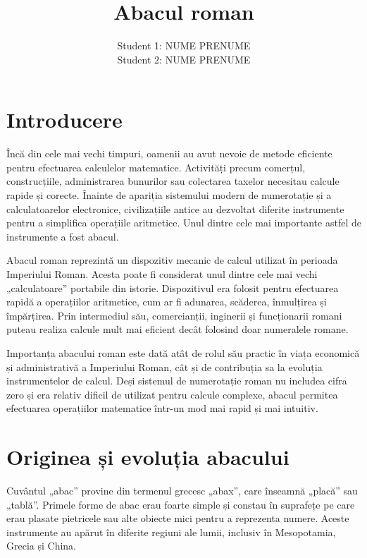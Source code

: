 \documentclass[12pt,a4paper]{article}
\title{\textbf{Abacul roman}}
\author{
Student 1: NUME PRENUME \\
Student 2: NUME PRENUME
}
\date{}
\begin{document}
\maketitle
\thispagestyle{empty}

\newpage

\section*{Introducere}

Încă din cele mai vechi timpuri, oamenii au avut nevoie de metode eficiente pentru efectuarea calculelor matematice. Activități precum comerțul, construcțiile, administrarea bunurilor sau colectarea taxelor necesitau calcule rapide și corecte. Înainte de apariția sistemului modern de numerotație și a calculatoarelor electronice, civilizațiile antice au dezvoltat diferite instrumente pentru a simplifica operațiile aritmetice. Unul dintre cele mai importante astfel de instrumente a fost abacul.

Abacul roman reprezintă un dispozitiv mecanic de calcul utilizat în perioada Imperiului Roman. Acesta poate fi considerat unul dintre cele mai vechi „calculatoare” portabile din istorie. Dispozitivul era folosit pentru efectuarea rapidă a operațiilor aritmetice, cum ar fi adunarea, scăderea, înmulțirea și împărțirea. Prin intermediul său, comercianții, inginerii și funcționarii romani puteau realiza calcule mult mai eficient decât folosind doar numeralele romane. \cite{romanabacuswiki}

Importanța abacului roman este dată atât de rolul său practic în viața economică și administrativă a Imperiului Roman, cât și de contribuția sa la evoluția instrumentelor de calcul. Deși sistemul de numerotație roman nu includea cifra zero și era relativ dificil de utilizat pentru calcule complexe, abacul permitea efectuarea operațiilor matematice într-un mod mai rapid și mai intuitiv. \cite{ancientcomputers}

\section*{Originea și evoluția abacului}

Cuvântul „abac” provine din termenul grecesc „abax”, care înseamnă „placă” sau „tablă”. Primele forme de abac erau foarte simple și constau în suprafețe pe care erau plasate pietricele sau alte obiecte mici pentru a reprezenta numere. Aceste instrumente au apărut în diferite regiuni ale lumii, inclusiv în Mesopotamia, Grecia și China. \cite{unrvabacus}
\end{document}
